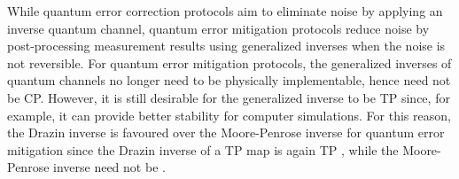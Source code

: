\documentclass[submission,copyright,creativecommons]{eptcs}
\begin{document}
While quantum error correction protocols  aim to eliminate noise by applying an inverse quantum channel, quantum error mitigation protocols  reduce noise by post-processing measurement results using generalized inverses  when the noise  is not reversible. For quantum error mitigation protocols, the generalized inverses of quantum channels no longer need to be physically implementable, hence need not be CP. However, it is still desirable for the generalized inverse to be TP since, for example, it can provide better stability for computer simulations. 
For this reason, the Drazin inverse is favoured over the Moore-Penrose inverse for quantum error mitigation since the Drazin inverse \cite[Chap 7]{campbell2009generalized} of a TP map is again TP \cite[Thm 2]{cao2021nisq}, while the Moore-Penrose inverse \cite[Chap 1]{campbell2009generalized} need not be \cite[Ex 2]{cao2021nisq}. 




\end{document}
